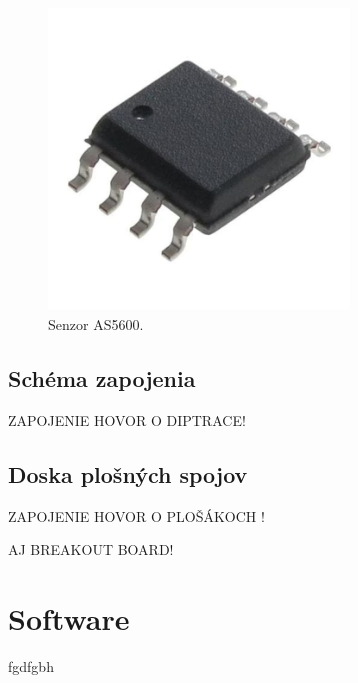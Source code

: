 \begin{figure}[!tbh]
\centering
\includegraphics[width=80mm]{obr/hall.jpg}
\caption{Senzor AS5600.}\label{OBRAZOK 2.2}
\end{figure}

\subsection{Schéma zapojenia}

ZAPOJENIE HOVOR O DIPTRACE!

\subsection{Doska plošných spojov}

ZAPOJENIE HOVOR O PLOŠÁKOCH !

AJ BREAKOUT BOARD!

\section{Software}
fgdfgbh 